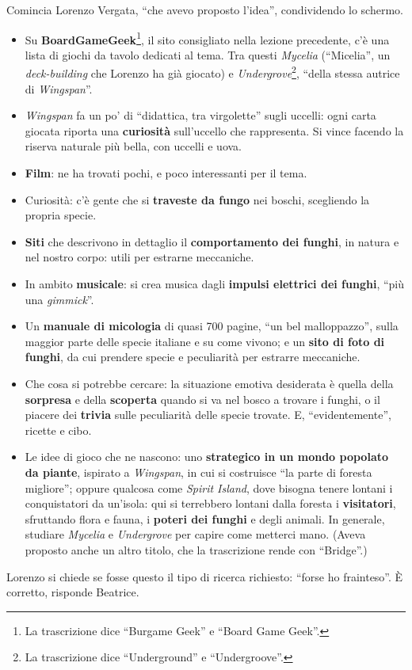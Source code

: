 Comincia Lorenzo Vergata, ``che avevo proposto l'idea'', condividendo lo schermo.
\begin{itemize}
  \item Su \textbf{BoardGameGeek}\footnote{La trascrizione dice ``Burgame Geek'' e
        ``Board Game Geek''.}, il sito consigliato nella lezione precedente, c'è una
        lista di giochi da tavolo dedicati al tema. Tra questi \emph{Mycelia}
        (``Micelia'', un \emph{deck-building} che Lorenzo ha già giocato) e
        \emph{Undergrove}\footnote{La trascrizione dice ``Underground'' e
        ``Undergroove''.}, ``della stessa autrice di \emph{Wingspan}''.
  \item \emph{Wingspan} fa un po' di ``didattica, tra virgolette'' sugli uccelli:
        ogni carta giocata riporta una \textbf{curiosità} sull'uccello che
        rappresenta. Si vince facendo la riserva naturale più bella, con uccelli e
        uova.
  \item \textbf{Film}: ne ha trovati pochi, e poco interessanti per il tema.
  \item Curiosità: c'è gente che si \textbf{traveste da fungo} nei boschi, scegliendo
        la propria specie.
  \item \textbf{Siti} che descrivono in dettaglio il \textbf{comportamento dei
        funghi}, in natura e nel nostro corpo: utili per estrarne meccaniche.
  \item In ambito \textbf{musicale}: si crea musica dagli \textbf{impulsi elettrici dei
        funghi}, ``più una \emph{gimmick}''.
  \item Un \textbf{manuale di micologia} di quasi 700 pagine, ``un bel malloppazzo'',
        sulla maggior parte delle specie italiane e su come vivono; e un \textbf{sito
        di foto di funghi}, da cui prendere specie e peculiarità per estrarre
        meccaniche.
  \item Che cosa si potrebbe cercare: la situazione emotiva desiderata è quella della
        \textbf{sorpresa} e della \textbf{scoperta} quando si va nel bosco a trovare i
        funghi, o il piacere dei \textbf{trivia} sulle peculiarità delle specie
        trovate. E, ``evidentemente'', ricette e cibo.
  \item Le idee di gioco che ne nascono: uno \textbf{strategico in un mondo popolato
        da piante}, ispirato a \emph{Wingspan}, in cui si costruisce ``la parte di
        foresta migliore''; oppure qualcosa come \emph{Spirit Island}, dove bisogna
        tenere lontani i conquistatori da un'isola: qui si terrebbero lontani dalla
        foresta i \textbf{visitatori}, sfruttando flora e fauna, i \textbf{poteri dei
        funghi} e degli animali. In generale, studiare \emph{Mycelia} e
        \emph{Undergrove} per capire come metterci mano. (Aveva proposto anche un
        altro titolo, che la trascrizione rende con ``Bridge''.)
\end{itemize}
Lorenzo si chiede se fosse questo il tipo di ricerca richiesto: ``forse ho
frainteso''. È corretto, risponde Beatrice.

